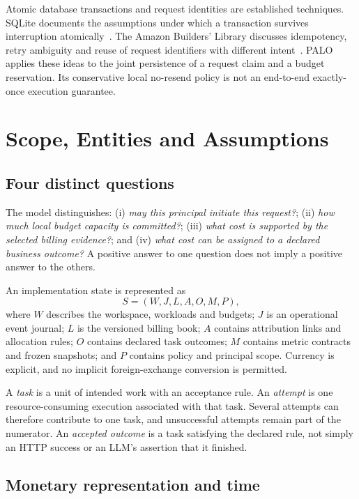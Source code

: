\documentclass[10pt,twocolumn]{article}
\begin{document}
Atomic database transactions and request identities are established techniques. SQLite documents the assumptions under which a transaction survives interruption atomically~\cite{sqlite}. The Amazon Builders' Library discusses idempotency, retry ambiguity and reuse of request identifiers with different intent~\cite{retries}. PALO applies these ideas to the joint persistence of a request claim and a budget reservation. Its conservative local no-resend policy is not an end-to-end exactly-once execution guarantee.

\section{Scope, Entities and Assumptions}
\label{sec:model}

\subsection{Four distinct questions}

The model distinguishes: (i) \emph{may this principal initiate this request?}; (ii) \emph{how much local budget capacity is committed?}; (iii) \emph{what cost is supported by the selected billing evidence?}; and (iv) \emph{what cost can be assigned to a declared business outcome?} A positive answer to one question does not imply a positive answer to the others.

An implementation state is represented as
\begin{equation}
S=(W,J,L,A,O,M,P),
\end{equation}
where $W$ describes the workspace, workloads and budgets; $J$ is an operational event journal; $L$ is the versioned billing book; $A$ contains attribution links and allocation rules; $O$ contains declared task outcomes; $M$ contains metric contracts and frozen snapshots; and $P$ contains policy and principal scope. Currency is explicit, and no implicit foreign-exchange conversion is permitted.

A \emph{task} is a unit of intended work with an acceptance rule. An \emph{attempt} is one resource-consuming execution associated with that task. Several attempts can therefore contribute to one task, and unsuccessful attempts remain part of the numerator. An \emph{accepted outcome} is a task satisfying the declared rule, not simply an HTTP success or an LLM's assertion that it finished.

\subsection{Monetary representation and time}
\end{document}
